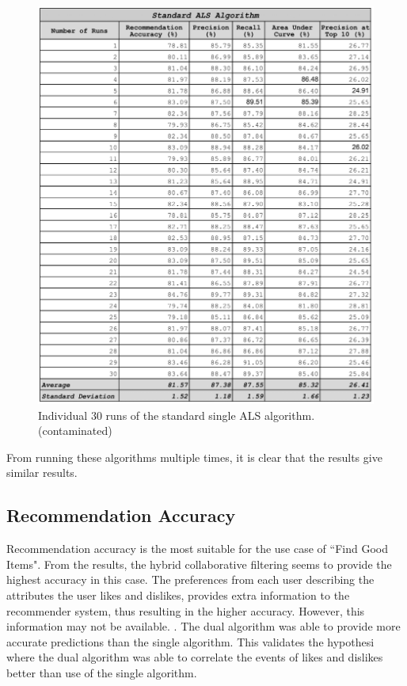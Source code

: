 \begin{figure}
\centering
\includegraphics[scale=0.3]{images/single_als_30_runs.png}
\caption{Individual 30 runs of the standard single ALS algorithm. (contaminated)}
\label{fig:single_algorithm}
\end{figure}

From running these algorithms multiple times, it is clear that the results give similar results. 

\subsection{Recommendation Accuracy}
Recommendation accuracy is the most suitable for the use case of ``Find Good Items". From the results, the hybrid collaborative filtering seems to provide the highest accuracy in this case. The preferences from each user describing the attributes the user likes and dislikes, provides extra information to the recommender system, thus resulting in the higher accuracy. However, this information may not be available. . The dual algorithm was able to provide more accurate predictions than the single algorithm. This validates the hypothesi where the dual algorithm was able to correlate the events of likes and dislikes better than use of the single algorithm.

